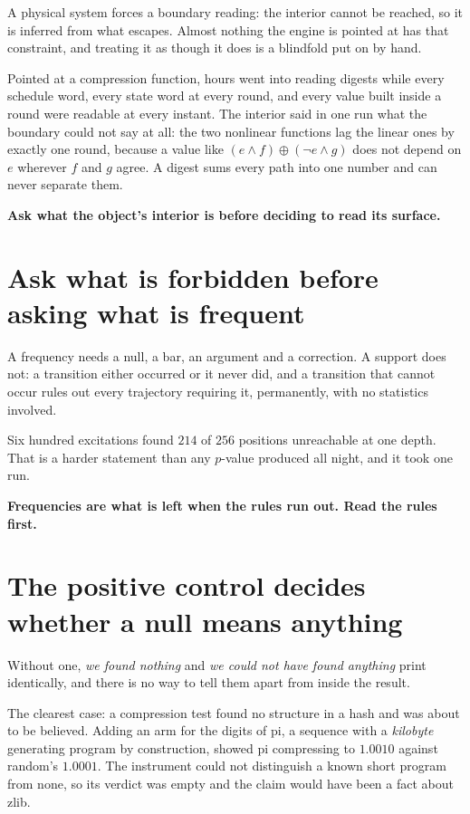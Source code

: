 A physical system forces a boundary reading: the interior cannot be reached, so it is inferred from what escapes. Almost nothing the engine is pointed at has that constraint, and treating it as though it does is a blindfold put on by hand.

Pointed at a compression function, hours went into reading digests while every schedule word, every state word at every round, and every value built inside a round were readable at every instant. The interior said in one run what the boundary could not say at all: the two nonlinear functions lag the linear ones by exactly one round, because a value like \((e \wedge f) \oplus (\neg e \wedge g)\) does not depend on \(e\) wherever \(f\) and \(g\) agree. A digest sums every path into one number and can never separate them.

\textbf{Ask what the object's interior is before deciding to read its surface.}

\section{Ask what is forbidden before asking what is frequent}

A frequency needs a null, a bar, an argument and a correction. A support does not: a transition either occurred or it never did, and a transition that cannot occur rules out every trajectory requiring it, permanently, with no statistics involved.

Six hundred excitations found \(214\) of \(256\) positions unreachable at one depth. That is a harder statement than any \(p\)-value produced all night, and it took one run.

\textbf{Frequencies are what is left when the rules run out. Read the rules first.}

\section{The positive control decides whether a null means anything}

Without one, \emph{we found nothing} and \emph{we could not have found anything} print identically, and there is no way to tell them apart from inside the result.

The clearest case: a compression test found no structure in a hash and was about to be believed. Adding an arm for the digits of pi, a sequence with a \emph{kilobyte} generating program by construction, showed pi compressing to \(1.0010\) against random's \(1.0001\). The instrument could not distinguish a known short program from none, so its verdict was empty and the claim would have been a fact about zlib.

